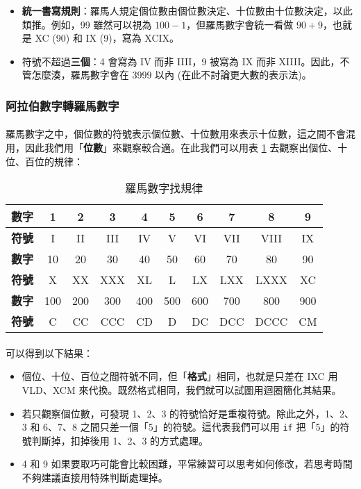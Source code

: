 \documentclass[12pt,a4paper,oneside]{report}
\begin{document}
\begin{CJK}{UTF8}{bkai}
\begin{itemize}
\item \textbf{統一書寫規則}：羅馬人規定個位數由個位數決定、十位數由十位數決定，以此類推。例如，99 雖然可以視為 $100-1$，但羅馬數字會統一看做 $90+9$，也就是 XC (90) 和 IX (9)，寫為 XCIX。
\item 符號不超過\textbf{三個}：4 會寫為 IV 而非 IIII，9 被寫為 IX 而非 XIIII。因此，不管怎麼湊，羅馬數字會在 3999 以內 (在此不討論更大數的表示法)。
\end{itemize}

\subsubsection{阿拉伯數字轉羅馬數字}

\paragraph{}羅馬數字之中，個位數的符號表示個位數、十位數用來表示十位數，這之間不會混用，因此我們用「{\color{red}\textbf{位數}}」來觀察較合適。在此我們可以用表 \ref{string:mani:table:roman:number:regular} 去觀察出個位、十位、百位的規律：

\begin{table}[h!]
  \centering
  \begin{tabular}{|c||c|c|c|c|c|c|c|c|c|}
  \hline
  \textbf{數字} & 1 & 2 & 3 & 4 & 5 & 6 & 7 & 8 & 9\\
  \hline
  \textbf{符號} & I & II & III & IV & V & VI & VII & VIII & IX\\
  \hline
  \hline
  \textbf{數字} & 10 & 20 & 30 & 40 & 50 & 60 & 70 & 80 & 90\\
  \hline
  \textbf{符號} & X & XX & XXX & XL & L & LX & LXX & LXXX & XC\\
  \hline
  \hline
  \textbf{數字} & 100 & 200 & 300 & 400 & 500 & 600 & 700 & 800 & 900\\
  \hline
  \textbf{符號} & C & CC & CCC & CD & D & DC & DCC & DCCC & CM\\
  \hline
  \end{tabular}
  \caption{羅馬數字找規律}
  \label{string:mani:table:roman:number:regular}
\end{table}

\paragraph{}可以得到以下結果：
\begin{itemize}
\item 個位、十位、百位之間符號不同，但「{\color{blue}\textbf{格式}}」相同，也就是只差在 IXC 用 VLD、XCM 來代換。既然格式相同，我們就可以試圖用迴圈簡化其結果。
\item 若只觀察個位數，可發現 1、2、3 的符號恰好是重複符號。除此之外，1、2、3 和 6、7、8 之間只差一個「5」的符號。這代表我們可以用 \lstinline!if! 把「5」的符號判斷掉，扣掉後用 1、2、3 的方式處理。
\item 4 和 9 如果要取巧可能會比較困難，平常練習可以思考如何修改，若思考時間不夠建議直接用特殊判斷處理掉。
\end{itemize}


\end{CJK}
\end{document}
